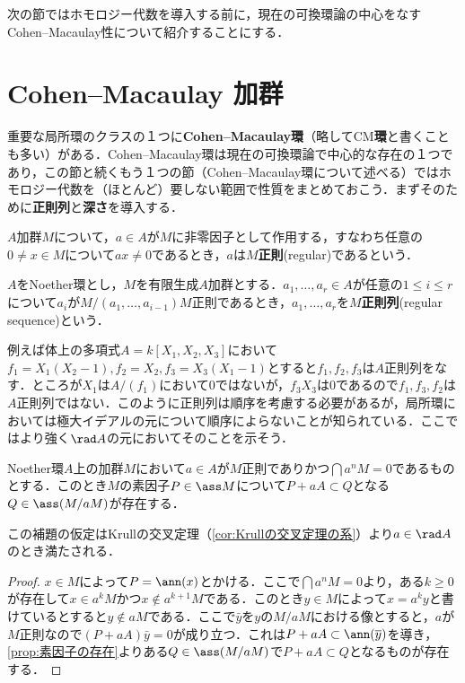 次の節ではホモロジー代数を導入する前に，現在の可換環論の中心をなすCohen--Macaulay性について紹介することにする．

\section{Cohen--Macaulay 加群}

重要な局所環のクラスの１つに\textbf{Cohen--Macaulay環}（略してCM\textbf{環}と書くことも多い）がある．Cohen--Macaulay環は現在の可換環論で中心的な存在の１つであり，この節と続くもう１つの節（Cohen--Macaulay環について述べる）ではホモロジー代数を（ほとんど）要しない範囲で性質をまとめておこう．まずそのために\textbf{正則列}と\textbf{深さ}を導入する．

\begin{defi}[正則元]
	$A$加群$M$について，$a\in A$が$M$に非零因子として作用する，すなわち任意の$0\neq x\in M$について$ax\neq0$であるとき，$a$は$M$\textbf{正則}(regular)であるという．
\end{defi}

\begin{defi}[正則列]
	$A$をNoether環とし，$M$を有限生成$A$加群とする．$a_1,\dots,a_r\in A$が任意の$1\leq i\leq r$について$a_i$が$M/(a_1,\dots,a_{i-1})M$正則であるとき，$a_1,\dots,a_r$を$M$\textbf{正則列}(regular sequence)という．
\end{defi}

例えば体上の多項式$A=k[X_1,X_2,X_3]$において$f_1=X_1(X_2-1),f_2=X_2,f_3=X_3(X_1-1)$とすると$f_1,f_2,f_3$は$A$正則列をなす．ところが$X_1$は$A/(f_1)$において$0$ではないが，$f_3X_3$は$0$であるので$f_1,f_3,f_2$は$A$正則列ではない．このように正則列は順序を考慮する必要があるが，局所環においては極大イデアルの元について順序によらないことが知られている．ここではより強く$\rad A$の元においてそのことを示そう．

\begin{lem}\label{lem:正則元と素因子}
	Noether環$A$上の加群$M$において$a\in A$が$M$正則でありかつ$\bigcap a^nM=0$であるものとする．このとき$M$の素因子$P\in\ass M$について$P+aA\subset Q$となる$Q\in\ass (M/aM)$が存在する．
\end{lem}

この補題の仮定はKrullの交叉定理（\ref{cor:Krullの交叉定理の系}）より$a\in\rad A$のとき満たされる．

\begin{proof}
	$x\in M$によって$P=\ann (x)$とかける．ここで$\bigcap a^nM=0$より，ある$k\geq0$が存在して$x\in a^kM$かつ$x\not\in a^{k+1}M$である．このとき$y\in M$によって$x=a^ky$と書けているとすると$y\not\in aM$である．ここで$\bar{y}$を$y$の$M/aM$における像とすると，$a$が$M$正則なので$(P+aA)\bar{y}=0$が成り立つ．これは$P+aA \subset\ann (\bar{y})$を導き，\ref{prop:素因子の存在}よりある$Q\in\ass (M/aM)$で$P+aA\subset Q$となるものが存在する．
\end{proof}

